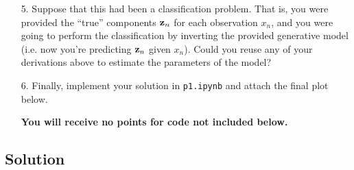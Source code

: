 \documentclass[submit]{harvardml}
\begin{document}
\begin{framed}
\begin{enumerate}
\item[5.] Suppose that this had been a classification problem. That is,
  you were provided the ``true'' components $\mathbf{z}_n$ for each
  observation $x_n$,
  and you were going to perform the classification by
  inverting the provided generative model (i.e. now you're predicting $\mathbf{z}_n$ given $x_n$). Could you reuse any of
  your derivations above to estimate the parameters of the model?
  

\item[6.] Finally, implement your solution in \texttt{p1.ipynb} and attach the final plot below.

{\bfseries You will receive no points for code not included below.}
\end{enumerate}
  
\end{framed}

\subsection*{Solution}
\end{document}
